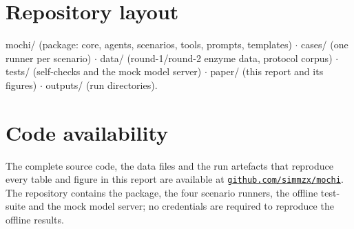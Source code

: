 \section{Repository layout}

mochi/ (package: core, agents, scenarios, tools, prompts, templates) $\cdot$ cases/ (one runner per scenario) $\cdot$ data/ (round-1/round-2 enzyme data, protocol corpus) $\cdot$ tests/ (self-checks and the mock model server) $\cdot$ paper/ (this report and its figures) $\cdot$ outputs/ (run directories).

\section{Code availability}

The complete source code, the data files and the run artefacts that reproduce every table and figure in this report are available at \href{https://github.com/simmzx/mochi}{\texttt{github.com/simmzx/mochi}}. The repository contains the package, the four scenario runners, the offline test-suite and the mock model server; no credentials are required to reproduce the offline results.
